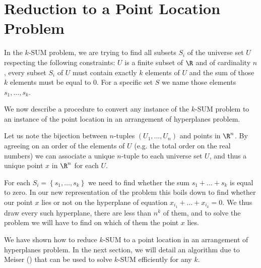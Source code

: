 \section{Reduction to a Point Location Problem}

In the $k$-SUM problem, we are trying to find all subsets $S_i$ of the universe set
$U$ respecting the following constraints: $U$ is a finite subset of $\R$ and of
cardinality $n$, every subset $S_i$ of $U$ must contain exactly
$k$ elements of $U$ and the sum of those $k$ elements must be equal to $0$.
For a specific set $S$ we name those elements $s_1, \dots, s_k$.

We now describe a procedure to convert any instance of the $k$-SUM problem to an
instance of the point location in an arrangement of hyperplanes problem.

Let us note the bijection between $n$-tuples $(U_1, \dots, U_n)$ and points in
$\R^n$. By agreeing on an order of the elements of $U$ (e.g. the total order on
the real numbers) we can associate a unique $n$-tuple to each universe set $U$,
and thus a unique point $x$ in $\R^n$ for each $U$.

For each $S_i = \left\{s_1, \dots, s_k\right\}$ we need to find whether the sum $s_1
+ \dots + s_k$ is equal to zero. In our new representation of the problem this
boils down to find whether our point $x$ lies or not on the hyperplane of
equation $x_{i_1} + \dots + x_{i_k} = 0$. We thus draw every such hyperplane,
there are less than $n^k$ of them, and to solve the problem
we will have to find on which of them the point $x$ lies.

We have shown how to reduce $k$-SUM to a point location in an
arrangement of hyperplanes problem. In the next section, we will detail an
algorithm due to Meiser (\cite{meiser:1993}) that can be used to solve $k$-SUM
efficiently for any $k$.
